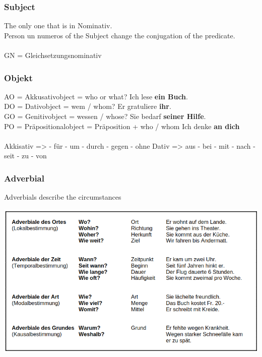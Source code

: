 \subsubsection{Subject}

The only one that is in Nominativ.\\
Person un numeros of the Subject change the conjugation of the predicate.\\
\\
GN = Gleichsetzungsnominativ \arrow {}  \\

\subsubsection{Objekt}

AO = Akkusativobject = who or what? \arrow Ich lese \textbf{ein Buch}.\\
DO = Dativobject = wem / whom? \arrow Er gratuliere \textbf{ihr}.\\
GO = Genitivobject = wessen / whose? \arrow Sie bedarf \textbf{seiner Hilfe}.\\
PO = Präpositionalobject = Präposition + who / whom \arrow Ich denke \textbf{an dich}\\
\\
Akkisativ => - für - um - durch - gegen - ohne
Dativ => aus - bei - mit - nach - seit - zu - von

\subsubsection{Adverbial}

Adverbials describe the circumstances

\includegraphics[width=\textwidth]{./german/imgs/adverbial.png}

